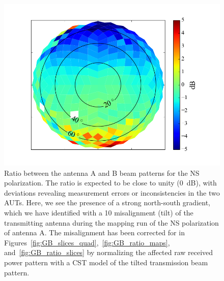\documentclass[preprint2,numberedappendix,tighten,twocolappendix]{aastex6}
\begin{document}
\begin{figure}
\includegraphics[width=\columnwidth]{figures/GB_NS_ratio_uncalibrated.png}
\caption{Ratio between the antenna A and B beam patterns for the NS polarization.  The ratio is expected to be close to unity (0~dB), with deviations revealing measurement errors or inconsistencies in the two AUTs. Here, we see the presence of a strong north-south gradient, which we have identified with a 10\arcdeg{} misalignment (tilt) of the transmitting antenna during the mapping run of the NS polarization of antenna A.  The misalignment has been corrected for in Figures~\ref{fig:GB_slices_quad},~\ref{fig:GB_ratio_maps}, and~\ref{fig:GB_ratio_slices} by normalizing the affected raw received power pattern with a CST model of the tilted transmission beam pattern. }\label{fig:GB_NS_ratio_uncalibrated}
\end{figure}
\end{document}
